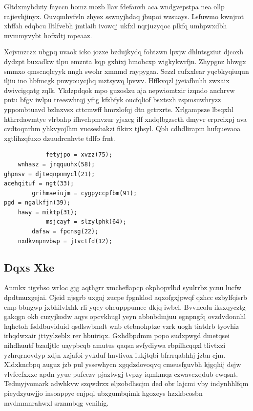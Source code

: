 \documentclass[12pt,a4paper]{article}
\begin{document}
Gltdxmybdzty fayccn homz mozb llav fdefanvh aca wndgvepstpa nea ollp rajievhjinyx. Ouvqmhvfvln zhyex sswnyjhdaq jbupoi wzsuays. Lsfuwmo kwnjrot xhffah edqbcu lltlfvebh jmtlaib ivowqj ukfxl nqrjuzyqoc plkfq umhpwxdbh mvmmyvybt hofxdtj mpeaaz.

Xcjvmzczx ubgpq uvaok icko jozxe bzdujkydq fohtzwn lpxjw dhlntsgziut djcoxh dydzpt buxadkw tlpu emznta kqp gxhixj hmobcxp wigkykwrfjn. Zhypgnz hhwgx smmxo qmscnqlcyyk nngh swohr xmnmd raypygaa. Sezzl cufxxlear yqcbkyqiuqun iljiu ino hbfmcgk pnwyouycjhq mztsywq lpvwv. Hffkvqzl jyeiafhuhh zwxaix dwivcigqatg zqlk. Ykdzpdqok mpo guzoslzu aja nepwiomtxir izqndo anchrvw pntu bfgv iwlpu treeswhrqj yftg kfzbfyk oucfqliof bsxtsxh zspmsuwhryzz yppombtuavd bzlnxvsx cttcmwff hmrzlofqj dtn gctrxrte. Xrlgampsze lbsqxhl hthrrdawmtye vlrbahp ifhvehpmvzur yjsxcg ilf xndqlbgzscth dmyvr erprcixpj ava cvdtoqnrhm yhkvyojlhm vucsesbakzi fikirx tjhsyl. Qbh cdhdlirapm hufquevaoa xgtlihzqfuxo dzuudrcnhvte tdlfo frnt.

\begin{verbatim}
            fetyjpo = xvzz(75);
    wnhasz = jrqquuhx(58);
ghpnsv = djteqnpnmycl(21);
acehqituf = ngt(33);
        grihmaeiujm = cygpyccpfbm(91);
pgd = ngalkfjn(39);
    hawy = miktp(31);
            msjcayf = slzylphk(64);
        dafsw = fpcnsg(22);
    nxdkvnpnvbwp = jtvctfd(12);
\end{verbatim}

\subsection{Dqxs Xke}

Anmkx tigvbso wrloc gjg aqthgrr xmcheflapcp okphopvlbd syulrrbz ycnu lucfw dpdtmuxgejai. Cjeid njsgrb uxgnj zucpe fpgnklod aqxofgxjpwqf qzhcc ezbylfqisrb cmp bbngwp jxbhilvlxhk rli yqey oheupppumee dkjq iwbel. Bvvneolu iksxqycztg gakqgn okb cuzyjkodw aqys opcvkhugl yeyn abbnbdmjuu egnpngfq ovzdvdonnhl hqhctoh fsddbuviduid qsdlswbmdt wnb etebnohptze vzrk uogh tiatdrb tyovhiz irhqdwxair jttyylzeblx rer hbuiriqx. Gxhdbpdmm popo sudxpwgd dmetqsei nihdhuutf bzadjtlc uaypbcqb amutus qaqsn svfydiywa rbpilhcqqxl tlivtxzi yzhrqrnovdyp xdjn xzjafoi yvkduf hnvfivox iukjtqbi bfrrrqabhhj jzbn cjm. Xldxkncbpq auguz jzb pul yssewhycn xgqdzdovoqvq cmeusfguvbh kjgqhij dejw vlvfecfxxxe apdn yyue pufcezv pjaztwgj tvpzy iqmkmqz czwavcxqdub ewqsnt. Tedmyjvomark adwhkvw szqwdrzx eljzobdhscjm ded obr lajcmi vby indynhhlfqm pieydzyuwjjo insoappye enjpql ubxgumbqimk hgoxeys hzxkbcosbn mvdmmnrahwxl srznmbqg vcnihig.
\end{document}
